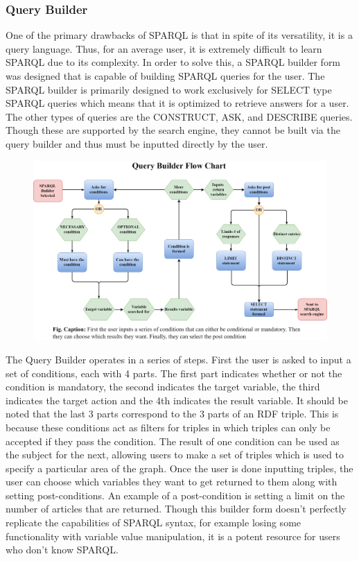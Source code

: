 \documentclass[12pt]{article}
\begin{document}
	\subsubsection{Query Builder}
	\quad One of the primary drawbacks of SPARQL is that in spite of its versatility, it is a query language. Thus, for an average user, it is extremely difficult to learn SPARQL due to its complexity. In order to solve this, a SPARQL builder form was designed that is capable of building SPARQL queries for the user. The SPARQL builder is primarily designed to work exclusively for SELECT type SPARQL queries which means that it is optimized to retrieve answers for a user. The other types of queries are the CONSTRUCT, ASK, and DESCRIBE queries. Though these are supported by the search engine, they cannot be built via the query builder and thus must be inputted directly by the user. 
	\begin{figure}[h!]
		\centering
		\includegraphics[scale=0.17]{Builderform_vJSHS2.0}
	\end{figure}
	\quad The Query Builder operates in a series of steps. First the user is asked to input a set of conditions, each with 4 parts. The first part indicates whether or not the condition is mandatory, the second indicates the target variable, the third indicates the target action and the 4th indicates the result variable. It should be noted that the last 3 parts correspond to the 3 parts of an RDF triple. This is because these conditions act as filters for triples in which triples can only be accepted if they pass the condition. The result of one condition can be used as the subject for the next, allowing users to make a set of triples which is used to specify a particular area of the graph. Once the user is done inputting triples, the user can choose which variables they want to get returned to them along with setting post-conditions. An example of a post-condition is setting a limit on the number of articles that are returned. Though this builder form doesn’t perfectly replicate the capabilities of SPARQL syntax, for example losing some functionality with variable value manipulation, it is a potent resource for users who don’t know SPARQL. 
\end{document}
